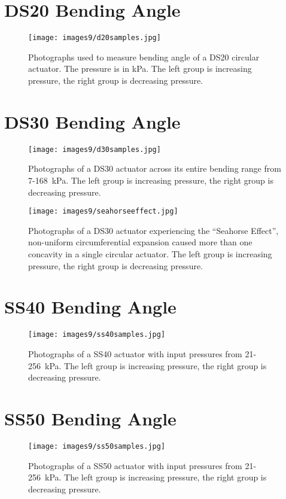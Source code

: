 \clearpage
\chapter{DS20 Bending Angle}
\label{appendix:d20all}

\begin{figure}[ht]
    \centering
     \texttt{[image: images9/d20samples.jpg]}
    \caption{Photographs used to measure bending angle of a DS20 circular actuator. The pressure is in kPa. The left group is increasing pressure, the right group is decreasing pressure.}
    \label{fig:d20samples}
\end{figure}

\chapter{DS30 Bending Angle}
\label{appendix:d30all}

\begin{figure}[ht]
    \centering
     \texttt{[image: images9/d30samples.jpg]}
    \caption{Photographs of a DS30 actuator across its entire bending range from 7-168~kPa. The left group is increasing pressure, the right group is decreasing pressure.}
    \label{fig:d30samples}
\end{figure}

\begin{figure}[ht]
    \centering
     \texttt{[image: images9/seahorseeffect.jpg]}
    \caption{Photographs of a DS30 actuator experiencing the ``Seahorse Effect'', non-uniform circumferential expansion caused more than one concavity in a single circular actuator. The left group is increasing pressure, the right group is decreasing pressure.}
    \label{fig:seahorseeffect}
\end{figure}

\chapter{SS40 Bending Angle}
\label{appendix:s40all}

\begin{figure}[ht]
    \centering
     \texttt{[image: images9/ss40samples.jpg]}
    \caption{Photographs of a SS40 actuator with input pressures from 21-256~kPa. The left group is increasing pressure, the right group is decreasing pressure.}
    \label{fig:ss40samples}
\end{figure}

\chapter{SS50 Bending Angle}
\label{appendix:s50all}
\begin{figure}[ht]
    \centering
     \texttt{[image: images9/ss50samples.jpg]}
    \caption{Photographs of a SS50 actuator with input pressures from 21-256~kPa. The left group is increasing pressure, the right group is decreasing pressure.}
    \label{fig:ss50samples}
\end{figure}

